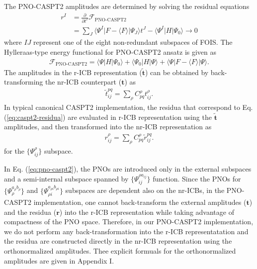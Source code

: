\documentclass[aip,jcp,amsmath,twocolumn,floatfix,reprint,fleqn]{revtex4-1}
\begin{document}
The PNO-CASPT2 amplitudes are determined by solving the residual equations
%
\begin{align}
  r^I&=\frac{\partial}{\partial t^I}\mathscr{F}_\text{PNO-CASPT2} \nonumber \\
     &=\sum_J \langle\Psi^I|F-\langle F\rangle|\Psi_J\rangle t^J-\langle\Psi^I|H|\Psi_0\rangle\rightarrow 0 \label{eq:caspt2-residua}
\end{align}
%
where $IJ$ represent one of the eight non-redundant subspaces of FOIS.
%
The Hylleraas-type energy functional for PNO-CASPT2 ansatz is given as
%
\begin{align}
  \mathscr{F}_\text{PNO-CASPT2}=\langle\Psi|H|\Psi_0\rangle+\langle\Psi_0|H|\Psi\rangle+\langle\Psi|F-\langle F\rangle|\Psi\rangle.
\end{align}
%
The amplitudes in the r-ICB representation ($\tilde{\mathbf{t}}$) can be obtained by back-transforming the nr-ICB counterpart ($\mathbf{t}$) as
%
\begin{align}
  \tilde{t}^{pq}_{ij} = \sum_{\rho} C_{pq}^\rho  t^{\rho}_{ij}.
\end{align}
%
In typical canonical CASPT2 implementation, the residua that correspond to Eq. (\ref{eq:caspt2-residua}) are evaluated in r-ICB representation using the $\tilde{\mathbf{t}}$ amplitudes, and then transformed into the nr-ICB representation as
%
\begin{align}
  r^{\rho}_{ij}=\sum_{\rho} C_{pq}^\rho \tilde{r}^{pq}_{ij}.
\end{align}
for the $\{\Psi^{\rho}_{ij}\}$ subspace.

%
In Eq. (\ref{eq:pno-caspt2}), the PNOs are introduced only in the external subspaces and a semi-internal subspace spanned by $\{\Psi_{ij}^{\rho a_{ij}}\}$ function.
%
Since the PNOs for $\{\Psi_{\rho}^{a_{\rho}b_{\rho}}\}$ and $\{\Psi_{\rho i}^{a_{\rho i}b_{\rho i}}\}$ subspaces are dependent also on the nr-ICBs, in the PNO-CASPT2 implementation, one cannot back-transform the external amplitudes ($\mathbf{t}$) and the residua ($\mathbf{r}$) into the r-ICB representation while taking advantage of compactness of the PNO space.
%
Therefore, in our PNO-CASPT2 implementation, we do not perform any back-transformation into the r-ICB representatation and the residua are constructed directly in the nr-ICB representation using the orthonormalized amplitudes.
%
Thee explicit formuals for the orthonormalized amplitudes are given in Appendix I.
\end{document}
